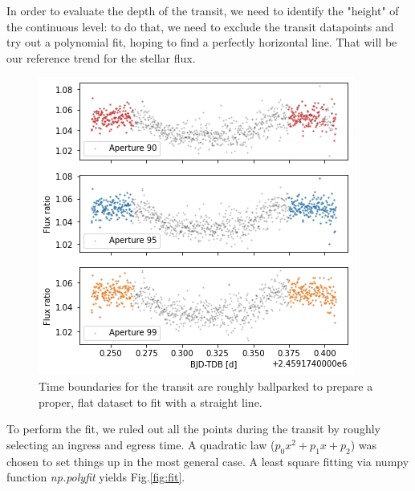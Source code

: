 \documentclass[a4paper,11pt,twocolumn]{article}
\begin{document}
In order to evaluate the depth of the transit, we need to identify the "height" 
of the continuous level: to do that, we need to exclude the transit datapoints 
and try out a polynomial fit, hoping to find a perfectly horizontal line. That 
will be our reference trend for the stellar flux.
\begin{figure}
    \centering  
    \includegraphics[scale=0.5, angle=0]{../pictures/taste/fit_setting.png}
    \caption{Time boundaries for the transit are roughly ballparked to 
    prepare a proper, flat dataset to fit with a straight line.}
    \label{fig:fit_setting}
\end{figure}
To perform the fit, we ruled out all the points during the transit by roughly 
selecting an ingress and egress time. A quadratic law ($p_0 x^2 + p_1 x +p_2$)
was chosen to set things up in the most general case. A least square fitting 
via numpy function \textit{np.polyfit} yields Fig.\ref{fig:fit}.
\end{document}
